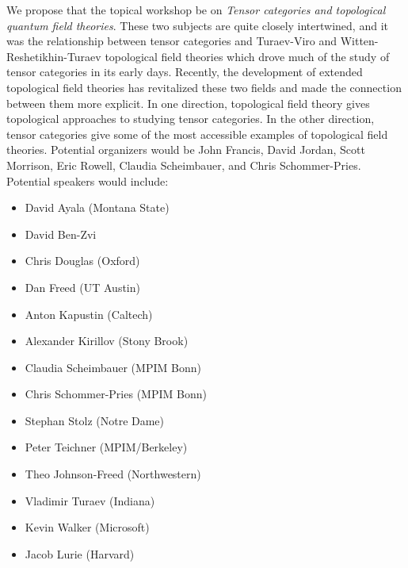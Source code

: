 \documentclass[12pt]{article}
\begin{document}
We propose that the topical workshop be on \emph{Tensor categories and topological quantum field theories}. These two subjects are quite closely intertwined, and it was the relationship between tensor categories and Turaev-Viro and Witten-Reshetikhin-Turaev topological field theories which drove much of the study of tensor categories in its early days.  Recently, the development of extended topological field theories has revitalized these two fields and made the connection between them more explicit. In one direction, topological field theory gives topological approaches to studying tensor categories. In the other direction, tensor categories give some of the most accessible examples of topological field theories. 
Potential organizers would be John Francis, David Jordan, Scott Morrison, Eric Rowell, Claudia Scheimbauer, and Chris Schommer-Pries.
Potential speakers would include:
\begin{multicols}{2}
\begin{itemize}
  \setlength{\itemsep}{1pt}
  \setlength{\parskip}{0pt}
  \setlength{\parsep}{0pt}
\item David Ayala	(Montana State)
\item David Ben-Zvi
\item Chris Douglas	(Oxford)
\item Dan Freed	(UT Austin)
\item Anton Kapustin	(Caltech)
\item Alexander Kirillov	(Stony Brook)
\item Claudia Scheimbauer	(MPIM Bonn)
\item Chris Schommer-Pries	(MPIM Bonn)
\item Stephan Stolz	(Notre Dame)
\item Peter Teichner	(MPIM/Berkeley)
\item Theo Johnson-Freed	(Northwestern)
\item Vladimir Turaev	(Indiana)
\item Kevin Walker (Microsoft)
\item Jacob Lurie (Harvard)
\end{itemize}
\end{multicols}
\end{document}
